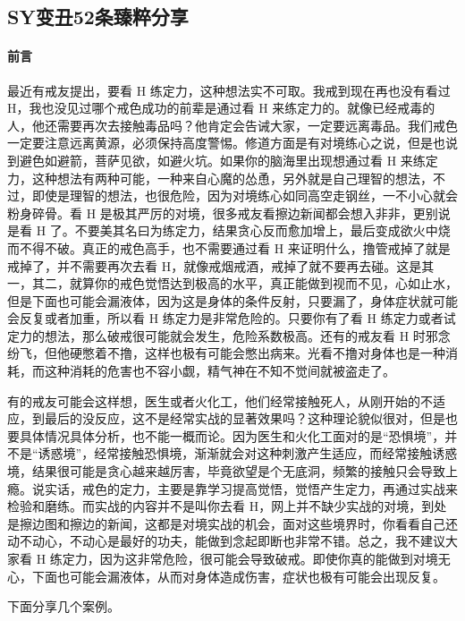 \subsection{SY变丑52条臻粹分享}\label{79}

\paragraph*{前言}

最近有戒友提出，要看 H 练定力，这种想法实不可取。我戒到现在再也没有看过 H，我也没见过哪个戒色成功的前辈是通过看 H 来练定力的。就像已经戒毒的人，他还需要再次去接触毒品吗？他肯定会告诫大家，一定要远离毒品。我们戒色一定要注意远离黄源，必须保持高度警惕。修道方面是有对境练心之说，但是也说到避色如避箭，菩萨见欲，如避火坑。如果你的脑海里出现想通过看 H 来练定力，这种想法有两种可能，一种来自心魔的怂恿，另外就是自己理智的想法，不过，即使是理智的想法，也很危险，因为对境练心如同高空走钢丝，一不小心就会粉身碎骨。看 H 是极其严厉的对境，很多戒友看擦边新闻都会想入非非，更别说是看 H 了。不要美其名曰为练定力，结果贪心反而愈加增上，最后变成欲火中烧而不得不破。真正的戒色高手，也不需要通过看 H 来证明什么，撸管戒掉了就是戒掉了，并不需要再次去看 H，就像戒烟戒酒，戒掉了就不要再去碰。这是其一，其二，就算你的戒色觉悟达到极高的水平，真正能做到视而不见，心如止水，但是下面也可能会漏液体，因为这是身体的条件反射，只要漏了，身体症状就可能会反复或者加重，所以看 H 练定力是非常危险的。只要你有了看 H 练定力或者试定力的想法，那么破戒很可能就会发生，危险系数极高。还有的戒友看 H 时邪念纷飞，但他硬憋着不撸，这样也极有可能会憋出病来。光看不撸对身体也是一种消耗，而这种消耗的危害也不容小觑，精气神在不知不觉间就被盗走了。

有的戒友可能会这样想，医生或者火化工，他们经常接触死人，从刚开始的不适应，到最后的没反应，这不是经常实战的显著效果吗？这种理论貌似很对，但是也要具体情况具体分析，也不能一概而论。因为医生和火化工面对的是“恐惧境”，并不是“诱惑境”，经常接触恐惧境，渐渐就会对这种刺激产生适应，而经常接触诱惑境，结果很可能是贪心越来越厉害，毕竟欲望是个无底洞，频繁的接触只会导致上瘾。说实话，戒色的定力，主要是靠学习提高觉悟，觉悟产生定力，再通过实战来检验和磨练。而实战的内容并不是叫你去看 H，网上并不缺少实战的对境，到处是擦边图和擦边的新闻，这都是对境实战的机会，面对这些境界时，你看看自己还动不动心，不动心是最好的功夫，能做到念起即断也非常不错。总之，我不建议大家看 H 练定力，因为这非常危险，很可能会导致破戒。即使你真的能做到对境无心，下面也可能会漏液体，从而对身体造成伤害，症状也极有可能会出现反复。

下面分享几个案例。

